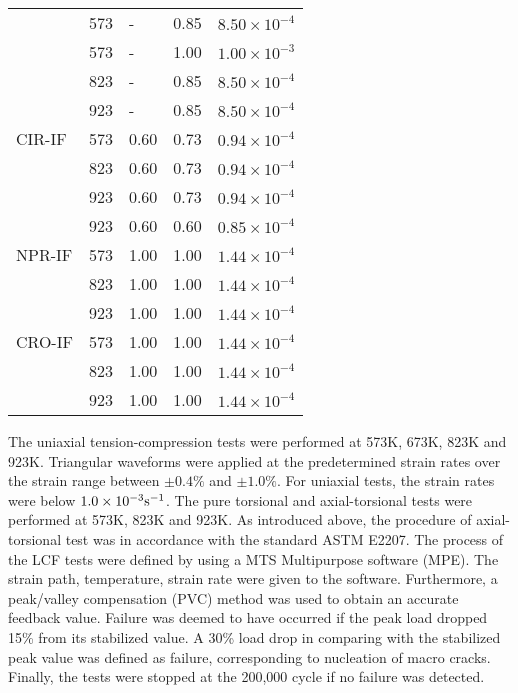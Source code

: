 \begin{table}[htbp]
\begin{tabular}{p{2cm}p{2cm}p{3cm}p{3cm}p{2cm}}
          & 573   & -     & 0.85  & $8.50\times 10^{-4}$ \\
          & 573   & -     & 1.00  & $1.00\times 10^{-3}$ \\
          & 823   & -     & 0.85  & $8.50\times 10^{-4}$ \\
          & 923   & -     & 0.85  & $8.50\times 10^{-4}$ \\
    \midrule
    CIR-IF  & 573   & 0.60  & 0.73  & $0.94\times 10^{-4}$ \\
          & 823   & 0.60  & 0.73  & $0.94\times 10^{-4}$ \\
          & 923   & 0.60  & 0.73  & $0.94\times 10^{-4}$ \\
          & 923   & 0.60  & 0.60  & $0.85\times 10^{-4}$ \\
    \midrule
    NPR-IF  & 573   & 1.00  & 1.00  & $1.44\times 10^{-4}$ \\
          & 823   & 1.00  & 1.00  & $1.44\times 10^{-4}$ \\
          & 923   & 1.00  & 1.00  & $1.44\times 10^{-4}$ \\
    \midrule
    CRO-IF  & 573   & 1.00  & 1.00  & $1.44\times 10^{-4}$ \\
          & 823   & 1.00  & 1.00  & $1.44\times 10^{-4}$ \\
          & 923   & 1.00  & 1.00  & $1.44\times 10^{-4}$ \\
    \bottomrule
    \end{tabular}%
  \label{tab:Loading-Conditions}%
\end{table}%
The uniaxial tension-compression tests were performed at 573K, 673K, 823K and 923K.
Triangular waveforms were applied at the predetermined strain rates over the strain range between $\pm 0.4\%$ and $\pm 1.0\%$.
For uniaxial tests, the strain rates were below $1.0\times 10^{-3}\rm{s}^{-1}$.
The pure torsional and axial-torsional tests were performed at 573K, 823K and 923K.
As introduced above, the procedure of axial-torsional test was in accordance with the standard ASTM E2207.
The process of the LCF tests were defined by using a MTS Multipurpose software (MPE).
The strain path, temperature, strain rate were given to the software.
Furthermore, a peak/valley compensation (PVC) method was used to obtain an accurate feedback value.
Failure was deemed to have occurred if the peak load dropped 15\% from its stabilized value. A 30\% load drop in comparing with the stabilized peak value was defined as failure, corresponding to nucleation of macro cracks.
Finally, the tests were stopped at the 200,000 cycle if no failure was detected.


